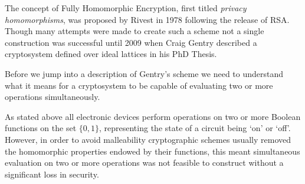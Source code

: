 The concept of Fully Homomorphic Encryption, first titled \emph{privacy homomorphisms}, was proposed by Rivest in 1978\cite{Riv1978} following the release of RSA. Though many attempts were made to create such a scheme not a single construction was successful until 2009 when Craig Gentry described a cryptosystem defined over ideal lattices in his PhD Thesis\cite{Gen2009}. 

Before we jump into a description of Gentry's scheme we need to understand what it means for a cryptosystem to be capable of evaluating two or more operations simultaneously.

As stated above all electronic devices perform operations on two or more Boolean functions on the set $\{0,1\}$, representing the state of a circuit being `on' or `off'. However, in order to avoid malleability cryptographic schemes usually removed the homomorphic properties endowed by their functions, this meant simultaneous evaluation on two or more operations was not feasible to construct without a significant loss in security. 

